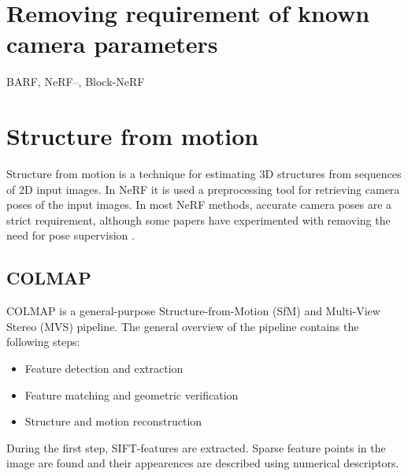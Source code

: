 \section{Removing requirement of known camera parameters}
BARF, NeRF--, Block-NeRF


\section{Structure from motion} \label{sec:sfm}
Structure from motion is a technique for estimating 3D structures from sequences of 2D input images. In NeRF it is used a preprocessing tool for retrieving camera poses of the input images. In most NeRF methods, accurate camera poses are a strict requirement, although some papers have experimented with removing the need for pose supervision \cite{lin_barf_2021}.

\subsection{COLMAP} \label{sec:colmap}
COLMAP is a general-purpose Structure-from-Motion (SfM) \cite{schoenberger2016sfm} and Multi-View Stereo (MVS) \cite{schoenberger2016mvs} pipeline. The general overview of the pipeline contains the following steps:
\begin{itemize}
    \item Feature detection and extraction
    \item Feature matching and geometric verification
    \item Structure and motion reconstruction
\end{itemize}

During the first step, SIFT-features \cite{Lowe2004} are extracted. Sparse feature points in the image are found and their appearences are described using numerical descriptors.

